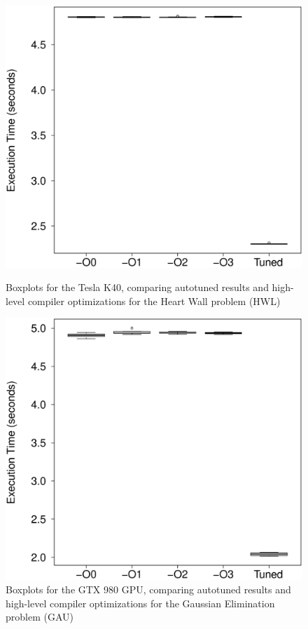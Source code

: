 \begin{figure}[htpb]
    \centering
    \begin{minipage}{.48\textwidth}
        \centering
        \includegraphics[scale=.22]{./images/heartwall-0-Tesla-K40-Box.eps}
        \caption{Boxplots for the Tesla K40, comparing autotuned results and high-level compiler optimizations for the Heart Wall problem (HWL)}
        \label{fig:K40hwl}
    \end{minipage}%
    \hfill
    \begin{minipage}{.48\textwidth}
        \centering
        \includegraphics[scale=.22]{./images/gaussian-0-GTX-980-Box.eps}
        \caption{Boxplots for the GTX 980 GPU, comparing autotuned results and high-level compiler optimizations for the Gaussian Elimination problem (GAU)}
        \label{fig:980gau}
    \end{minipage}%


\end{figure}
